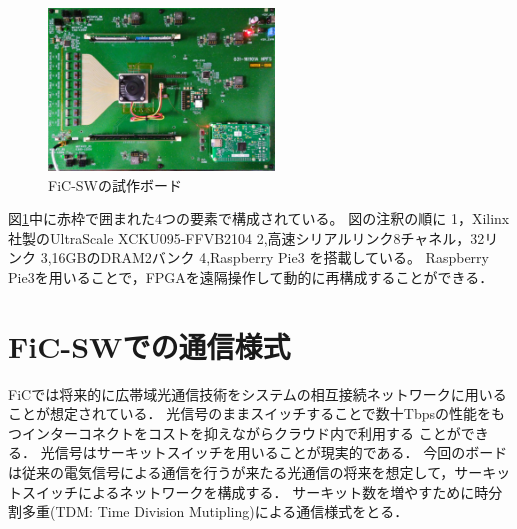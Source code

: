{\begin{figure}[h]
  \centering
  \includegraphics[width=6cm]{./chap3/fig/ficsw.pdf}
  \caption{FiC-SWの試作ボード}
  \label{fig:ficsw}
\end{figure}

図\ref{fig:ficsw}中に赤枠で囲まれた4つの要素で構成されている。
図の注釈の順に
1，Xilinx社製のUltraScale XCKU095-FFVB2104
2,高速シリアルリンク8チャネル，32リンク
3,16GBのDRAM2バンク
4,Raspberry Pie3
を搭載している。
Raspberry Pie3を用いることで，FPGAを遠隔操作して動的に再構成することができる．
\section{FiC-SWでの通信様式}
\label{sec:ficsw_communication}
FiCでは将来的に広帯域光通信技術をシステムの相互接続ネットワークに用いることが想定されている．
光信号のままスイッチすることで数十Tbpsの性能をもつインターコネクトをコストを抑えながらクラウド内で利用する
ことができる．
光信号はサーキットスイッチを用いることが現実的である．
今回のボードは従来の電気信号による通信を行うが来たる光通信の将来を想定して，サーキットスイッチによるネットワークを構成する．
サーキット数を増やすために時分割多重(TDM: Time Division Mutipling)による通信様式をとる．



}

